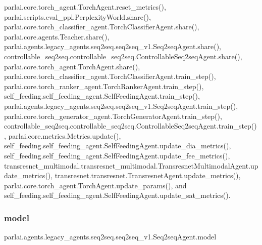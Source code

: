 parlai.\+core.\+torch\+\_\+agent.\+Torch\+Agent.\+reset\+\_\+metrics(), parlai.\+scripts.\+eval\+\_\+ppl.\+Perplexity\+World.\+share(), parlai.\+core.\+torch\+\_\+classifier\+\_\+agent.\+Torch\+Classifier\+Agent.\+share(), parlai.\+core.\+agents.\+Teacher.\+share(), parlai.\+agents.\+legacy\+\_\+agents.\+seq2seq.\+seq2seq\+\_\+v1.\+Seq2seq\+Agent.\+share(), controllable\+\_\+seq2seq.\+controllable\+\_\+seq2seq.\+Controllable\+Seq2seq\+Agent.\+share(), parlai.\+core.\+torch\+\_\+agent.\+Torch\+Agent.\+share(), parlai.\+core.\+torch\+\_\+classifier\+\_\+agent.\+Torch\+Classifier\+Agent.\+train\+\_\+step(), parlai.\+core.\+torch\+\_\+ranker\+\_\+agent.\+Torch\+Ranker\+Agent.\+train\+\_\+step(), self\+\_\+feeding.\+self\+\_\+feeding\+\_\+agent.\+Self\+Feeding\+Agent.\+train\+\_\+step(), parlai.\+agents.\+legacy\+\_\+agents.\+seq2seq.\+seq2seq\+\_\+v1.\+Seq2seq\+Agent.\+train\+\_\+step(), parlai.\+core.\+torch\+\_\+generator\+\_\+agent.\+Torch\+Generator\+Agent.\+train\+\_\+step(), controllable\+\_\+seq2seq.\+controllable\+\_\+seq2seq.\+Controllable\+Seq2seq\+Agent.\+train\+\_\+step(), parlai.\+core.\+metrics.\+Metrics.\+update(), self\+\_\+feeding.\+self\+\_\+feeding\+\_\+agent.\+Self\+Feeding\+Agent.\+update\+\_\+dia\+\_\+metrics(), self\+\_\+feeding.\+self\+\_\+feeding\+\_\+agent.\+Self\+Feeding\+Agent.\+update\+\_\+fee\+\_\+metrics(), transresnet\+\_\+multimodal.\+transresnet\+\_\+multimodal.\+Transresnet\+Multimodal\+Agent.\+update\+\_\+metrics(), transresnet.\+transresnet.\+Transresnet\+Agent.\+update\+\_\+metrics(), parlai.\+core.\+torch\+\_\+agent.\+Torch\+Agent.\+update\+\_\+params(), and self\+\_\+feeding.\+self\+\_\+feeding\+\_\+agent.\+Self\+Feeding\+Agent.\+update\+\_\+sat\+\_\+metrics().

\mbox{\label{classparlai_1_1agents_1_1legacy__agents_1_1seq2seq_1_1seq2seq__v1_1_1Seq2seqAgent_aeea96acec40c7a63d019ca56feca3c73}} 
\subsubsection{\texorpdfstring{model}{model}}
{\footnotesize\ttfamily parlai.\+agents.\+legacy\+\_\+agents.\+seq2seq.\+seq2seq\+\_\+v1.\+Seq2seq\+Agent.\+model}



